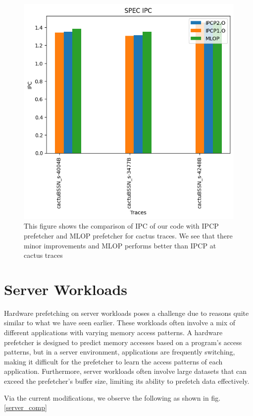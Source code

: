 \documentclass[conference]{IEEEtran}
\begin{document}
\begin{figure}
\includegraphics[scale=0.5]{Images/Bingo/spec_ipc_cac.png}
\caption{This figure shows the comparison of IPC of our code with IPCP prefetcher and MLOP prefetcher for cactus traces. We see that there minor improvements and MLOP performs better than IPCP at cactus traces}
\label{spec_after_opt_cactus}
\end{figure}

\section{Server Workloads}
Hardware prefetching on server workloads poses a challenge due to reasons quite similar to what we have seen earlier. These workloads often involve a mix of different applications with varying memory access patterns. A hardware prefetcher is designed to predict memory accesses based on a program's access patterns, but in a server environment, applications are frequently switching, making it difficult for the prefetcher to learn the access patterns of each application. Furthermore, server workloads often involve large datasets that can exceed the prefetcher's buffer size, limiting its ability to prefetch data effectively.

Via the current modifications, we observe the following as shown in fig. \ref{server_comp}
\end{document}
